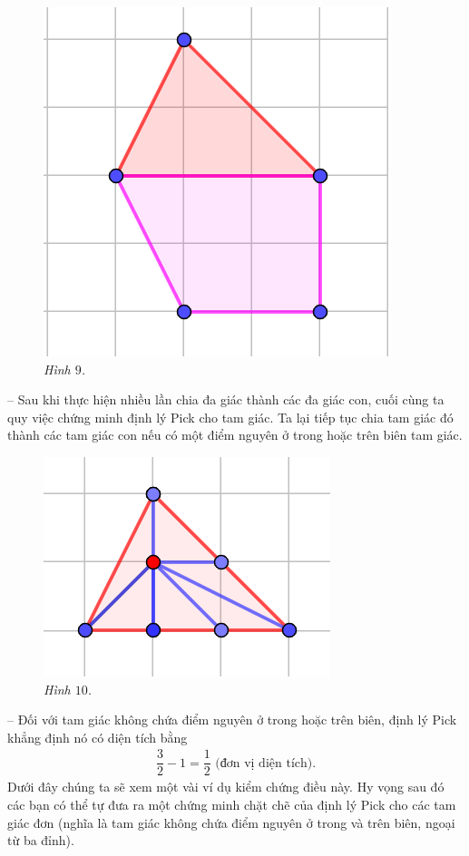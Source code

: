 \begin{multicols}{2}
	\begin{figure}[H]
		\vspace*{-5pt}
		\centering
		\captionsetup{labelformat= empty, justification=centering}
		\includegraphics[width= 0.45\linewidth]{9}
		\caption{\small\textit{\color{toancuabi}Hình $9$.}}
		\vspace*{-10pt}
	\end{figure}
	-- Sau khi thực hiện nhiều lần chia đa giác thành các đa giác con, cuối cùng ta quy việc chứng minh định lý Pick cho tam giác. Ta lại tiếp tục chia tam giác đó thành các tam giác con nếu có một điểm nguyên ở trong hoặc trên biên tam giác. 
	\begin{figure}[H]
		\vspace*{5pt}
		\centering
		\captionsetup{labelformat= empty, justification=centering}
		\includegraphics[width= 0.4\linewidth]{10}
		\caption{\small\textit{\color{toancuabi}Hình $10$.}}
		\vspace*{-10pt}
	\end{figure}
	-- Đối với tam giác không chứa điểm nguyên ở trong hoặc trên biên, định lý Pick khẳng định nó có diện tích bằng
	\begin{align*}
		\dfrac{3}{2}-1=\dfrac{1}{2} \text{ (đơn vị diện tích).}
	\end{align*}
	Dưới đây chúng ta sẽ xem một vài ví dụ kiểm chứng điều này. Hy vọng sau đó các bạn có thể tự đưa ra một chứng minh chặt chẽ của định lý Pick cho các tam giác đơn (nghĩa là tam giác không chứa điểm nguyên ở trong và trên biên, ngoại từ ba đỉnh).
	\begin{figure}[H]

\end{figure}
\end{multicols}
